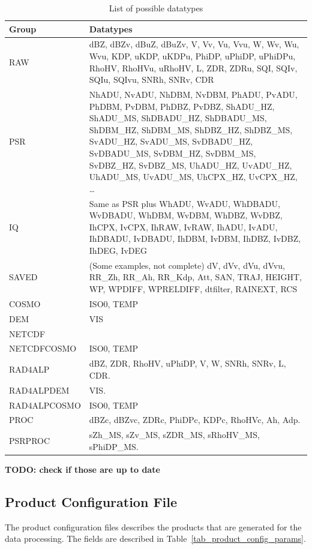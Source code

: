 \documentclass[a4paper,11pt,pdftex,twoside]{scrartcl}
\renewcommand{\bf}{\normalfont \bfseries}
\begin{document}
{{{\begin{table}[H]
\begin{tabularx}{\textwidth}{lX}
\bf{Group} & \bf{Datatypes}\\
\hline
RAW       & dBZ, dBZv, dBuZ, dBuZv, V, Vv, Vu, Vvu, W, Wv, Wu, Wvu,
            KDP, uKDP, uKDPu, PhiDP, uPhiDP, uPhiDPu, RhoHV,
            RhoHVu, uRhoHV, L, ZDR, ZDRu, SQI, SQIv, SQIu, SQIvu, SNRh, SNRv, CDR\\
PSR       & NhADU, NvADU, NhDBM, NvDBM, PhADU, PvADU, PhDBM, PvDBM,
            PhDBZ, PvDBZ, ShADU\_HZ, ShADU\_MS, ShDBADU\_HZ, ShDBADU\_MS,
            ShDBM\_HZ, ShDBM\_MS, ShDBZ\_HZ, ShDBZ\_MS, SvADU\_HZ, SvADU\_MS,
            SvDBADU\_HZ, SvDBADU\_MS, SvDBM\_HZ, SvDBM\_MS, SvDBZ\_HZ, SvDBZ\_MS,
            UhADU\_HZ, UvADU\_HZ, UhADU\_MS, UvADU\_MS, UhCPX\_HZ, UvCPX\_HZ, \ldots\\
IQ        & Same as PSR plus WhADU, WvADU, WhDBADU, WvDBADU, WhDBM, WvDBM, WhDBZ, WvDBZ, IhCPX, IvCPX, IhRAW, IvRAW, IhADU, IvADU, IhDBADU, IvDBADU, IhDBM, IvDBM, IhDBZ, IvDBZ, IhDEG, IvDEG\\
SAVED     & (Some examples, not complete) dV, dVv, dVu, dVvu, RR\_Zh, RR\_Ah,
            RR\_Kdp, Att, SAN, TRAJ, HEIGHT, WP, WPDIFF, WPRELDIFF,
            dtfilter, RAINEXT, RCS\\
COSMO     & ISO0, TEMP\\
DEM         & VIS\\
NETCDF    &\\
NETCDFCOSMO    & ISO0, TEMP\\
RAD4ALP & dBZ, ZDR, RhoHV, uPhiDP, V, W, SNRh, SNRv, L, CDR.\\
RAD4ALPDEM & VIS.\\
RAD4ALPCOSMO & ISO0, TEMP\\
PROC & dBZc, dBZvc, ZDRc, PhiDPc, KDPc, RhoHVc, Ah, Adp.\\
PSRPROC & sZh\_MS, sZv\_MS, sZDR\_MS, sRhoHV\_MS, sPhiDP\_MS.\\
\end{tabularx}
\caption{List of possible datatypes}
\label{tab_datatypes}
\end{table}

{\bf TODO: check if those are up to date}

\subsection{Product Configuration File}

The product configuration files describes the products that are generated
for the data processing. The fields are described in
Table~\ref{tab_product_config_params}.

}}}
\end{document}
